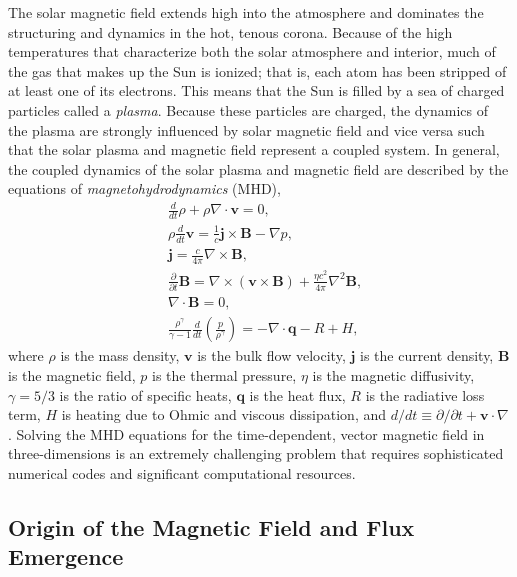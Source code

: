 The solar magnetic field extends high into the atmosphere and dominates the structuring and dynamics in the hot, tenous corona. Because of the high temperatures that characterize both the solar atmosphere and interior, much of the gas that makes up the Sun is ionized; that is, each atom has been stripped of at least one of its electrons. This means that the Sun is filled by a sea of charged particles called a \textit{plasma}. Because these particles are charged, the dynamics of the plasma are strongly influenced by solar magnetic field and vice versa such that the solar plasma and magnetic field represent a coupled system. In general, the coupled dynamics of the solar plasma and magnetic field are described by the equations of \textit{magnetohydrodynamics} (MHD),
\begin{align}
    &\frac{d}{dt}\rho + \rho\nabla\cdot\mathbf{v} = 0, \label{eq:mhd_continuity} \\
    &\rho\frac{d}{dt}\mathbf{v} = \frac{1}{c}\mathbf{j}\times\mathbf{B} - \nabla p, \label{eq:mhd_momentum} \\
    &\mathbf{j} = \frac{c}{4\pi}\nabla\times\mathbf{B}, \label{eq:mhd_ampere} \\
    &\frac{\partial}{\partial t}\mathbf{B} = \nabla\times(\mathbf{v}\times\mathbf{B}) + \frac{\eta c^2}{4\pi}\nabla^2\mathbf{B}, \label{eq:mhd_faraday} \\
    &\nabla\cdot\mathbf{B} = 0, \label{eq:mhd_divb} \\
    &\frac{\rho^\gamma}{\gamma - 1}\frac{d}{dt}\left(\frac{p}{\rho^{\gamma}}\right) = -\nabla\cdot\mathbf{q} - R + H, \label{eq:mhd_energy}
\end{align}
where $\rho$ is the mass density, $\mathbf{v}$ is the bulk flow velocity, $\mathbf{j}$ is the current density, $\mathbf{B}$ is the magnetic field, $p$ is the thermal pressure, $\eta$ is the magnetic diffusivity, $\gamma=5/3$ is the ratio of specific heats, $\mathbf{q}$ is the heat flux, $R$ is the radiative loss term, $H$ is heating due to Ohmic and viscous dissipation, and $d/dt\equiv\partial/\partial t + \mathbf{v}\cdot\nabla$ \citep{priest_magnetohydrodynamics_2014}. Solving the MHD equations for the time-dependent, vector magnetic field in three-dimensions is an extremely challenging problem that requires sophisticated numerical codes and significant computational resources.

\subsection{Origin of the Magnetic Field and Flux Emergence}\label{sec:magnetic-origins}

